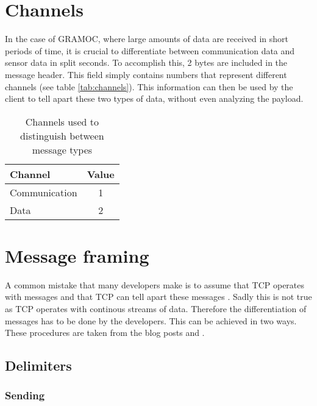 \section{Channels}
\label{sec:channels}

In the case of GRAMOC, where large amounts of data are received in short periods of time, it is crucial to differentiate between communication data and sensor data in split seconds. To accomplish this, 2 bytes are included in the message header. This field simply contains numbers that represent different channels (see table \vref{tab:channels}). This information can then be used by the client to tell apart these two types of data, without even analyzing the payload.

\begin{table}[h]
    \centering
    \begin{tabular}{| l | c |}
    \hline
    \textbf{Channel} & \textbf{Value} \\ \hline
    Communication & 1 \\ \hline
    Data & 2 \\
    \hline
    \end{tabular}
    \caption{Channels used to distinguish between message types}
    \label{tab:channels}
\end{table}

\section{Message framing}
\label{sec:messageframing}

A common mistake that many developers make is to assume that TCP operates with messages and that TCP can tell apart these messages \autocite{MessageFramingCleary} \autocite{MessageFramingSkotzko}. Sadly this is not true as TCP operates with continous streams of data. Therefore the differentiation of messages has to be done by the developers. This can be achieved in two ways. These procedures are taken from the blog posts  and .

\subsection{Delimiters}

\subsubsection{Sending}

